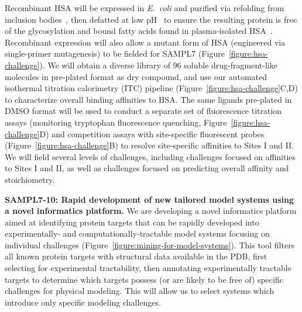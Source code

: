 \documentclass[11pt]{article}
\begin{document}
Recombinant HSA will be expressed in \emph{E.~coli} and purified via refolding from inclusion bodies~\cite{Latta:1987:Bio/Technology}, then defatted at low pH~\cite{Lang:2015:BiotechnologyProgress} to ensure the resulting protein is free of the glycosylation and bound fatty acids found in plasma-isolated HSA~\cite{Lang:2015:BiotechnologyProgress}.
Recombinant expression will also allow a mutant form of HSA (engineered via single-primer mutagenesis) to be fielded for SAMPL7 (Figure~\ref{figure:hsa-challenge}).
We will obtain a diverse library of 96 soluble drug-fragment-like molecules in pre-plated format as dry compound, and use our automated isothermal titration calorimetry (ITC) pipeline (Figure~\ref{figure:hsa-challenge}C,D) to characterize overall binding affinities to HSA.
The same ligands pre-plated in DMSO format will be used to conduct a separate set of fluorescence titration assays (monitoring tryptophan fluorescence quenching, Figure~\ref{figure:hsa-challenge}D) and competition assays with site-specific fluorescent probes (Figure~\ref{figure:hsa-challenge}B) to resolve site-specific affinities to Sites I and II.
We will field several levels of challenges, including challenges focused on affinities to Sites I and II, as well as challenges focused on predicting overall affinity and stoichiometry.

\textbf{SAMPL7-10: Rapid development of new tailored model systems using a novel informatics platform.} We are developing a novel informatics platform aimed at identifying protein targets that can be rapidly developed into experimentally- and computationally-tractable model systems focusing on individual challenges (Figure~\ref{figure:mining-for-model-systems}).
This tool filters all known protein targets with structural data available in the PDB, first selecting for experimental tractability, then annotating experimentally tractable targets to determine which targets possess (or are likely to be free of) specific challenges for physical modeling.
This will allow us to select systems which introduce only specific modeling challenges.
\end{document}
